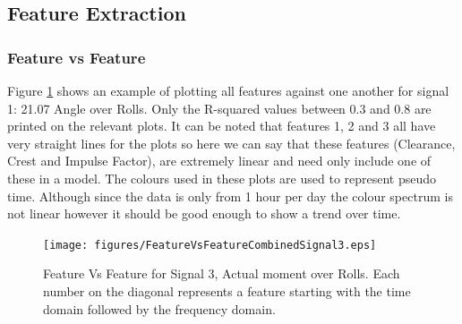 \documentclass{article}
\begin{document}
\subsection{Feature Extraction}

\subsubsection{Feature vs Feature}
Figure \ref{fig:FeatureVsFeatureCombinedSignal3} shows an example of plotting all features against one another for signal 1: 21.07 Angle over Rolls. Only the R-squared values between 0.3 and 0.8 are printed on the relevant plots. It can be noted that features 1, 2 and 3 all have very straight lines for the plots so here we can say that these features (Clearance, Crest and Impulse Factor), are extremely linear and need only include one of these in a model.
The colours used in these plots are used to represent pseudo time. Although since the data is only from 1 hour per day the colour spectrum is not linear however it should be good enough to show a trend over time.
\begin{figure}[H]
    \centering
    \texttt{[image: figures/FeatureVsFeatureCombinedSignal3.eps]}
    \caption{Feature Vs Feature for Signal 3, Actual moment over Rolls. Each number on the diagonal represents a feature starting with the time domain followed by the frequency domain.}
    \label{fig:FeatureVsFeatureCombinedSignal3}
\end{figure}
\end{document}
